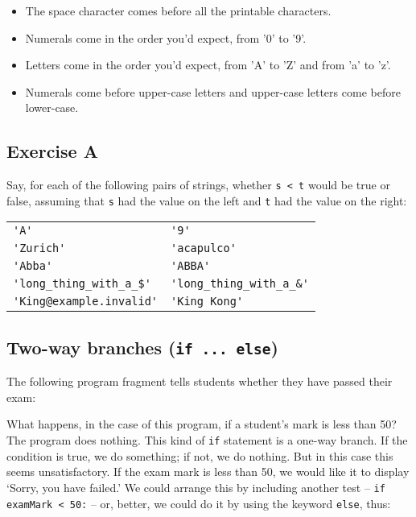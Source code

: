 \begin{itemize}
\item
The space character comes before all the printable characters.
\item
Numerals come in the order you'd expect, from '0' to '9'.
\item
Letters come in the order you'd expect, from 'A' to 'Z' and from 'a' to 'z'.
\item
Numerals come before upper-case letters and upper-case letters come before lower-case.
\end{itemize}

\pagebreak

\subsection*{Exercise A}

Say, for each of the following pairs of strings, whether \verb!s < t! would be
true or false, assuming that  \verb!s! had the value on the left and \verb!t!
had the value on the right:
\medskip

\begin{tabular}{ll}
\verb!'A'! & \verb!'9'!\\
\verb!'Zurich'! & \verb!'acapulco'!\\
\verb!'Abba'! & \verb!'ABBA'!\\
\verb!'long_thing_with_a_$'! & \verb!'long_thing_with_a_&'!\\
\verb!'King@example.invalid'! & \verb!'King Kong'!\\
\end{tabular}
\medskip

\subsection{Two-way branches (\texttt{if ... else})}
\label{sec:two-way-branches}

The following program fragment tells students whether they have passed
their exam: 


What happens, in the case of this program, if a student's mark is
less than 50?  The program does nothing.  This kind of \verb!if! statement is a
one-way branch.  If the condition is true, we do something; if not, we do
nothing.  But in this case
this seems unsatisfactory.  If the exam mark is less than 50, we would like
it to display `Sorry, you have failed.'  We could arrange this by
including another test -- \verb!if examMark < 50:!  -- or, better, we could
do it by using the keyword \verb!else!, thus:

